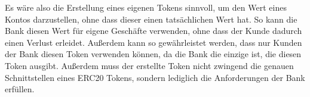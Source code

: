 \bigbreak
{}
\label{datenspeicherung:neuer-token}
\noindent
Es wäre also die Erstellung eines eigenen Tokens sinnvoll, um den Wert eines Kontos darzustellen, ohne dass dieser einen tatsächlichen Wert hat. So kann die Bank diesen Wert für eigene Geschäfte verwenden, ohne dass der Kunde dadurch einen Verlust erleidet. 
Außerdem kann so gewährleistet werden, dass nur Kunden der Bank diesen Token verwenden können, da die Bank die einzige ist, die diesen Token ausgibt.
Außerdem muss der erstellte Token nicht zwingend die genauen Schnittstellen eines ERC20 Tokens, sondern lediglich die Anforderungen der Bank erfüllen.